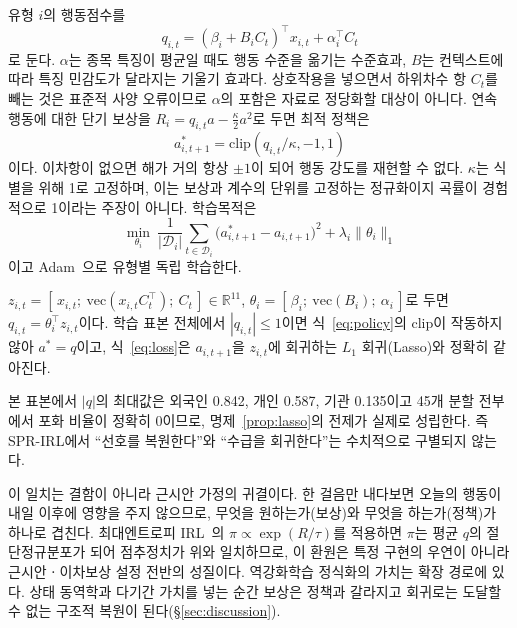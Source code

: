 유형 $i$의 행동점수를
\begin{equation}
q_{i,t}=(\beta_i+B_iC_t)^{\top}x_{i,t}+\alpha_i^{\top}C_t
\label{eq:score}
\end{equation}
로 둔다. $\alpha$는 종목 특징이 평균일 때도 행동 수준을 옮기는 수준효과, $B$는
컨텍스트에 따라 특징 민감도가 달라지는 기울기 효과다. 상호작용을 넣으면서 하위차수
항 $C_t$를 빼는 것은 표준적 사양 오류이므로 $\alpha$의 포함은 자료로 정당화할
대상이 아니다. 연속 행동에 대한 단기 보상을
$R_i=q_{i,t}a-\tfrac{\kappa}{2}a^{2}$로 두면 최적 정책은
\begin{equation}
a^{*}_{i,t+1}=\mathrm{clip}(q_{i,t}/\kappa,-1,1)
\label{eq:policy}
\end{equation}
이다. 이차항이 없으면 해가 거의 항상 $\pm1$이 되어 행동 강도를 재현할 수 없다.
$\kappa$는 식별을 위해 1로 고정하며, 이는 보상과 계수의 단위를 고정하는 정규화이지
곡률이 경험적으로 1이라는 주장이 아니다. 학습목적은
\begin{equation}
\min_{\theta_i}\ \frac{1}{|\mathcal{D}_i|}
\sum_{t\in\mathcal{D}_i}\!\bigl(a^{*}_{i,t+1}-a_{i,t+1}\bigr)^{2}
+\lambda_i\lVert\theta_i\rVert_1
\label{eq:loss}
\end{equation}
이고 Adam~\cite{kingma2015adam}으로 유형별 독립 학습한다.

\begin{proposition}[Lasso 환원]
\label{prop:lasso}
$z_{i,t}=[\,x_{i,t};\ \mathrm{vec}(x_{i,t}C_t^{\top});\ C_t\,]\in\mathbb{R}^{11}$,
$\theta_i=[\,\beta_i;\ \mathrm{vec}(B_i);\ \alpha_i\,]$로 두면
$q_{i,t}=\theta_i^{\top}z_{i,t}$이다. 학습 표본 전체에서 $|q_{i,t}|\le 1$이면
식~\eqref{eq:policy}의 clip이 작동하지 않아 $a^{*}=q$이고, 식~\eqref{eq:loss}은
$a_{i,t+1}$을 $z_{i,t}$에 회귀하는 $L_1$ 회귀(Lasso)와 정확히 같아진다.
\end{proposition}

본 표본에서 $|q|$의 최대값은 외국인 0.842, 개인 0.587, 기관 0.135이고 45개 분할
전부에서 포화 비율이 정확히 0이므로, 명제~\ref{prop:lasso}의 전제가 실제로
성립한다. 즉 SPR-IRL에서 ``선호를 복원한다''와 ``수급을 회귀한다''는 수치적으로
구별되지 않는다.

이 일치는 결함이 아니라 근시안 가정의 귀결이다. 한 걸음만 내다보면 오늘의 행동이
내일 이후에 영향을 주지 않으므로, 무엇을 원하는가(보상)와 무엇을 하는가(정책)가
하나로 겹친다. 최대엔트로피 IRL~\cite{ziebart2008maximum}의
$\pi\propto\exp(R/\tau)$를 적용하면 $\pi$는 평균 $q$의 절단정규분포가 되어
점추정치가 위와 일치하므로, 이 환원은 특정 구현의 우연이 아니라 근시안ㆍ이차보상
설정 전반의 성질이다. 역강화학습 정식화의 가치는 확장 경로에 있다. 상태 동역학과
다기간 가치를 넣는 순간 보상은 정책과 갈라지고 회귀로는 도달할 수 없는 구조적
복원이 된다(\S\ref{sec:discussion}).

